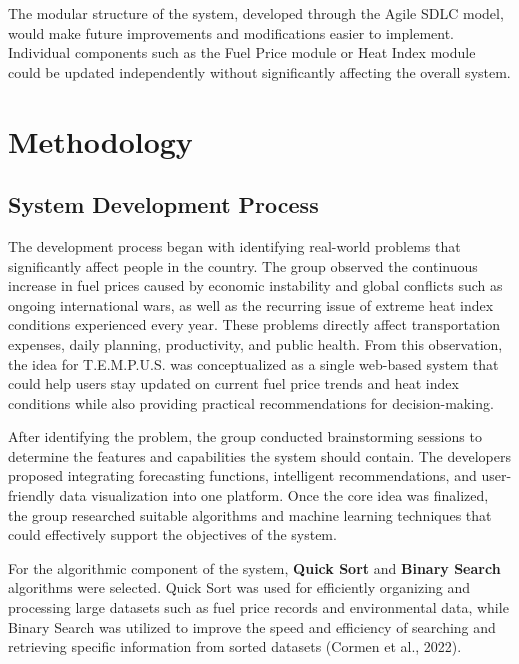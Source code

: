 \documentclass[12pt]{article}
\begin{document}
The modular structure of the system, developed through the Agile SDLC model, would make future improvements and modifications easier to implement. Individual components such as the Fuel Price module or Heat Index module could be updated independently without significantly affecting the overall system.

\section{Methodology}

\subsection{System Development Process}

The development process began with identifying real-world problems that significantly affect people in the country. The group observed the continuous increase in fuel prices caused by economic instability and global conflicts such as ongoing international wars, as well as the recurring issue of extreme heat index conditions experienced every year. These problems directly affect transportation expenses, daily planning, productivity, and public health. From this observation, the idea for T.E.M.P.U.S. was conceptualized as a single web-based system that could help users stay updated on current fuel price trends and heat index conditions while also providing practical recommendations for decision-making.

After identifying the problem, the group conducted brainstorming sessions to determine the features and capabilities the system should contain. The developers proposed integrating forecasting functions, intelligent recommendations, and user-friendly data visualization into one platform. Once the core idea was finalized, the group researched suitable algorithms and machine learning techniques that could effectively support the objectives of the system.

For the algorithmic component of the system, \textbf{Quick Sort} and \textbf{Binary Search} algorithms were selected. Quick Sort was used for efficiently organizing and processing large datasets such as fuel price records and environmental data, while Binary Search was utilized to improve the speed and efficiency of searching and retrieving specific information from sorted datasets (Cormen et al., 2022).
\end{document}
